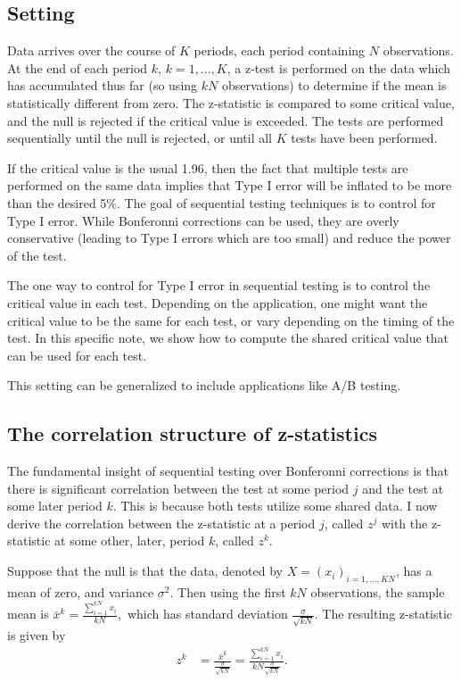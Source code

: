 \documentclass[final,3p,times]{elsarticle}
\begin{document}
\subsection{Setting}
Data arrives over the course of $K$ periods, each period containing $N$ observations. At the end of each period $k$, $k =1,..., K$, a z-test is performed on the data which has accumulated thus far (so using $kN$ observations) to determine if the mean is statistically different from zero. The z-statistic is compared to some critical value, and the null is rejected if the critical value is exceeded. The tests are performed sequentially until the null is rejected, or until all $K$ tests have been performed.

If the critical value is the usual 1.96, then the fact that multiple tests are performed on the same data implies that Type I error will be inflated to be more than the desired 5\%. The goal of sequential testing techniques is to control for Type I error. While Bonferonni corrections can be used, they are overly conservative (leading to Type I errors which are too small) and reduce the power of the test.

The one way to control for Type I error in sequential testing is to control the critical value in each test. Depending on the application, one might want the critical value to be the same for each test, or vary depending on the timing of the test. In this specific note, we show how to compute the shared critical value that can be used for each test.

This setting can be generalized to include applications like A/B testing.

\subsection{The correlation structure of z-statistics}
The fundamental insight of sequential testing over Bonferonni corrections is that there is significant correlation between the test at some period $j$ and the test at some later period $k$. This is because both tests utilize some shared data. I now derive the correlation between the z-statistic at a period $j$, called $z^j$ with the z-statistic at some other, later, period $k$, called $z^k$.

Suppose that the null is that the data, denoted by $X=(x_i)_{i=1,...,KN}$, has a mean of zero, and variance $\sigma^2$. Then using the first $kN$ observations, the sample mean is $\bar x^k = \frac{\sum_{i=1}^{kN}x_i}{kN},$ which has standard deviation $\frac{\sigma}{\sqrt{kN}}$. The resulting z-statistic is given by 
\begin{align}
 z^k &= \frac{\bar x^k}{\frac{\sigma}{\sqrt{kN}}}=\frac{\sum_{i=1}^{kN}x_i}{kN\frac{\sigma}{\sqrt{kN}}}.
\end{align}
\end{document}
